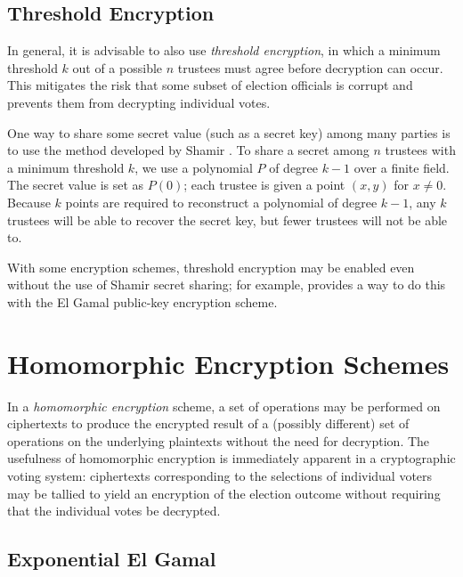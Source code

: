 \subsection{Threshold Encryption} \label{evote:design:threshold}
In general, it is advisable to also use \emph{threshold encryption}, in which a minimum threshold $k$ out of a possible $n$ trustees must agree before decryption can occur. This mitigates the risk that some subset of election officials is corrupt and prevents them from decrypting individual votes.

One way to share some secret value (such as a secret key) among many parties is to use the method developed by Shamir \cite{shamir79}. To share a secret among $n$ trustees with a minimum threshold $k$, we use a polynomial $P$ of degree $k-1$ over a finite field. The secret value is set as $P(0)$; each trustee is given a point $(x, y)$ for $x \neq 0$. Because $k$ points are required to reconstruct a polynomial of degree $k-1$, any $k$ trustees will be able to recover the secret key, but fewer trustees will not be able to.

With some encryption schemes, threshold encryption may be enabled even without the use of Shamir secret sharing; for example, \cite{pedersen91, gennaro} provides a way to do this with the El Gamal public-key encryption scheme.

\section{Homomorphic Encryption Schemes} \label{evote:homomorphic}

In a \emph{homomorphic encryption} scheme, a set of operations may be performed on ciphertexts to produce the encrypted result of a (possibly different) set of operations on the underlying plaintexts without the need for decryption. The usefulness of homomorphic encryption is immediately apparent in a cryptographic voting system: ciphertexts corresponding to the selections of individual voters may be tallied to yield an encryption of the election outcome without requiring that the individual votes be decrypted.

\subsection{Exponential El Gamal} \label{evote:homomorphic:elgamal}

